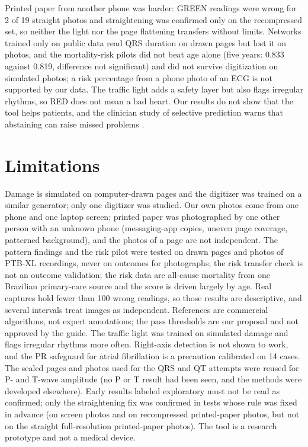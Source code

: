 \documentclass[conference]{IEEEtran}
\begin{document}
Printed paper from another phone was harder: GREEN readings were wrong for 2 of 19 straight photos and straightening was confirmed only on the recompressed set, so neither the light nor the page flattening transfers without limits. Networks trained only on public data read QRS duration on drawn pages but lost it on photos, and the mortality-risk pilots did not beat age alone (five years: 0.833 against 0.819, difference not significant) and did not survive digitization on simulated photos; a risk percentage from a phone photo of an ECG is not supported by our data. The traffic light adds a safety layer but also flags irregular rhythms, so RED does not mean a bad heart. Our results do not show that the tool helps patients, and the clinician study of selective prediction warns that abstaining can raise missed problems \cite{ref26}.

\section{Limitations}
Damage is simulated on computer-drawn pages and the digitizer was trained on a similar generator; only one digitizer was studied. Our own photos come from one phone and one laptop screen; printed paper was photographed by one other person with an unknown phone (messaging-app copies, uneven page coverage, patterned background), and the photos of a page are not independent. The pattern findings and the risk pilot were tested on drawn pages and photos of PTB-XL recordings, never on outcomes for photographs; the risk transfer check is not an outcome validation; the risk data are all-cause mortality from one Brazilian primary-care source and the score is driven largely by age. Real captures hold fewer than 100 wrong readings, so those results are descriptive, and several intervals treat images as independent. References are commercial algorithms, not expert annotations; the pass thresholds are our proposal and not approved by the guide. The traffic light was trained on simulated damage and flags irregular rhythms more often. Right-axis detection is not shown to work, and the PR safeguard for atrial fibrillation is a precaution calibrated on 14 cases. The sealed pages and photos used for the QRS and QT attempts were reused for P- and T-wave amplitude (no P or T result had been seen, and the methods were developed elsewhere). Early results labeled exploratory must not be read as confirmed; only the straightening fix was confirmed in tests whose rule was fixed in advance (on screen photos and on recompressed printed-paper photos, but not on the straight full-resolution printed-paper photos). The tool is a research prototype and not a medical device.
\end{document}
